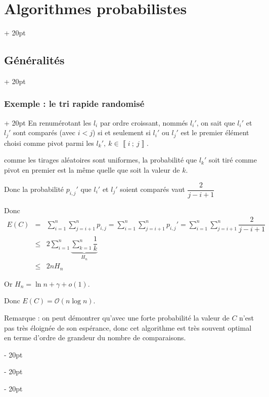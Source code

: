 \documentclass[a4paper, 12pt, twoside]{article}
\newcommand{\nset}[2]{\left\llbracket #1\ ;\ #2 \right\rrbracket}
\renewcommand{\le}{\leqslant}
\newcommand{\ind}[1][20pt]{\advance\leftskip + #1}
\newcommand{\deind}[1][20pt]{\advance\leftskip - #1}
\newenvironment{indt}[2][20pt]{#2 \par \ind[#1]}{\par \deind} %
\newcommand{\1}{\mathbbm 1}
\begin{document}
\begin{indt}{\section{Algorithmes probabilistes}}
\begin{indt}{\subsection{Généralités}}
\begin{indt}{\subsubsection{Exemple : le tri rapide randomisé}}
                En renumérotant les $l_i$ par ordre croissant, nommés $l_i'$, on sait que $l_i'$ et $l_j'$ sont comparés (avec $i < j$) si et seulement si $l_i'$ ou $l_j'$ est le premier élément choisi comme pivot parmi les $l_k',\ k \in \nset i j$.

                comme les tirages aléatoires sont uniformes, la probabilité que $l_k'$ soit tiré comme pivot en premier est la même quelle que soit la valeur de $k$.

                Donc la probabilité $p_{i, j}'$ que $l_i'$ et $l_j'$  soient comparés vaut $\dfrac{2}{j - i + 1}$

                Donc
                \[
                    \begin{array}{rcl}
                        E(C)
                        &=& \displaystyle
                        \sum_{i = 1}^n \sum_{j = i + 1}^n p_{i, j}
                        = \sum_{i = 1}^n \sum_{j = i + 1}^n p_{i, j}'
                        = \sum_{i = 1}^n \sum_{j = i + 1}^n \dfrac{2}{j - i + 1}
                        \\
                        &\le& \displaystyle
                        2 \sum_{i = 1}^n \underbrace{\sum_{k = 1}^n \dfrac 1 k}_{H_n}
                        \\
                        &\le& 2n H_n
                    \end{array}
                \]

                Or $H_n = \ln n + \gamma + o(1)$.

                Donc $E(C) = \mathcal O(n\log n)$.

                \vspace{12pt}
                
                Remarque : on peut démontrer qu'avec une forte probabilité la valeur de $C$ n'est pas très éloignée de son espérance, donc cet algorithme est très souvent optimal en terme d'ordre de grandeur du nombre de comparaisons.
            \end{indt}
        \end{indt}

        \vspace{12pt}
        

\end{indt}
\end{document}
